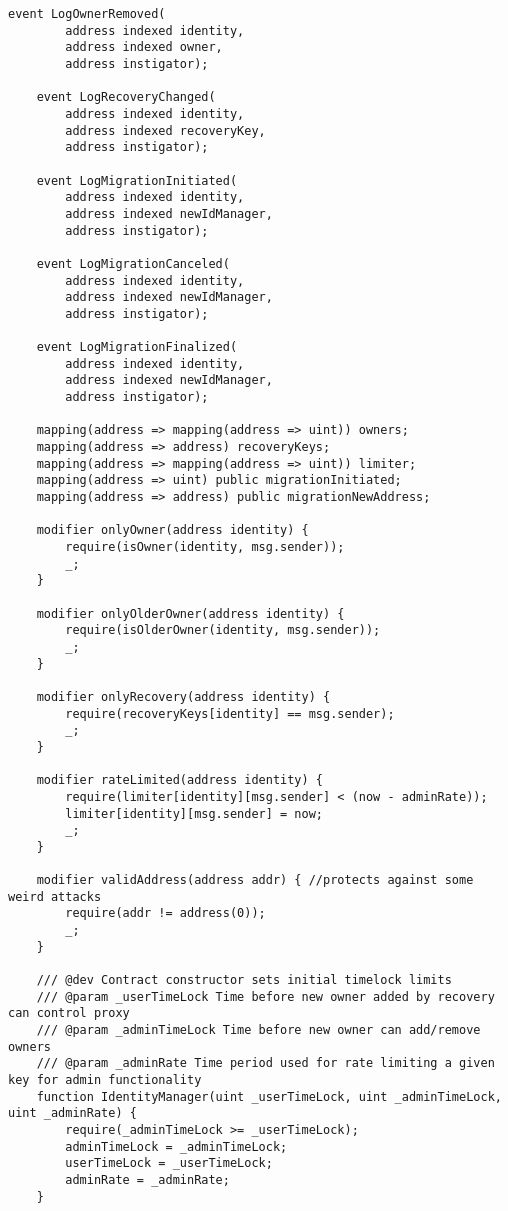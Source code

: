 \begin{itemize}
\begin{lstlisting}[language=Solidity]
    event LogOwnerRemoved(
        address indexed identity,
        address indexed owner,
        address instigator);

    event LogRecoveryChanged(
        address indexed identity,
        address indexed recoveryKey,
        address instigator);

    event LogMigrationInitiated(
        address indexed identity,
        address indexed newIdManager,
        address instigator);

    event LogMigrationCanceled(
        address indexed identity,
        address indexed newIdManager,
        address instigator);

    event LogMigrationFinalized(
        address indexed identity,
        address indexed newIdManager,
        address instigator);

    mapping(address => mapping(address => uint)) owners;
    mapping(address => address) recoveryKeys;
    mapping(address => mapping(address => uint)) limiter;
    mapping(address => uint) public migrationInitiated;
    mapping(address => address) public migrationNewAddress;

    modifier onlyOwner(address identity) {
        require(isOwner(identity, msg.sender));
        _;
    }

    modifier onlyOlderOwner(address identity) {
        require(isOlderOwner(identity, msg.sender));
        _;
    }

    modifier onlyRecovery(address identity) {
        require(recoveryKeys[identity] == msg.sender);
        _;
    }

    modifier rateLimited(address identity) {
        require(limiter[identity][msg.sender] < (now - adminRate));
        limiter[identity][msg.sender] = now;
        _;
    }

    modifier validAddress(address addr) { //protects against some weird attacks
        require(addr != address(0));
        _;
    }

    /// @dev Contract constructor sets initial timelock limits
    /// @param _userTimeLock Time before new owner added by recovery can control proxy
    /// @param _adminTimeLock Time before new owner can add/remove owners
    /// @param _adminRate Time period used for rate limiting a given key for admin functionality
    function IdentityManager(uint _userTimeLock, uint _adminTimeLock, uint _adminRate) {
        require(_adminTimeLock >= _userTimeLock);
        adminTimeLock = _adminTimeLock;
        userTimeLock = _userTimeLock;
        adminRate = _adminRate;
    }


\end{lstlisting}
\end{itemize}
